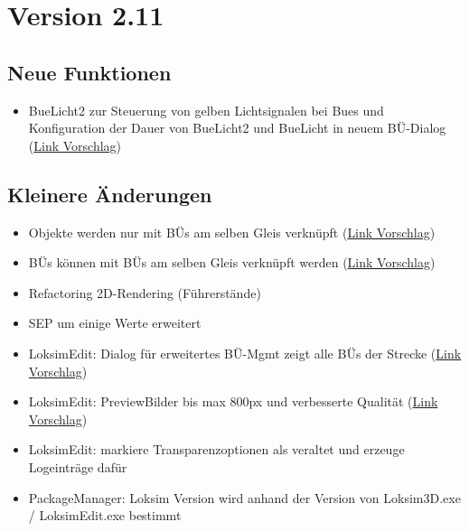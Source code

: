 \section{Version 2.11}

\subsection{Neue Funktionen}
\begin{itemize}
    \item BueLicht2 zur Steuerung von gelben Lichtsignalen bei Bues und Konfiguration der Dauer von BueLicht2 und BueLicht in neuem BÜ-Dialog (\href{https://www.loksimulatoren.de/forum/index.php?thread/8258-ampelsteuerung-an-bahn%C3%BCberg%C3%A4nge-mit-buelicht1-und-buelicht2/}{Link Vorschlag})
\end{itemize}

\subsection{Kleinere Änderungen}
\begin{itemize}
    \item Objekte werden nur mit BÜs am selben Gleis verknüpft (\href{https://www.loksimulatoren.de/forum/index.php?thread/5771-probleme-mit-durch-hauptsignale-%C3%BCberwachten-b%C3%BC/&postID=137100#post137100}{Link Vorschlag})
    \item BÜs können mit BÜs am selben Gleis verknüpft werden (\href{https://www.loksimulatoren.de/forum/index.php?thread/5771-probleme-mit-durch-hauptsignale-%C3%BCberwachten-b%C3%BC/&postID=137100#post137100}{Link Vorschlag})
    \item Refactoring 2D-Rendering (Führerstände)
    \item SEP um einige Werte erweitert
    \item LoksimEdit: Dialog für erweitertes BÜ-Mgmt zeigt alle BÜs der Strecke (\href{https://www.loksimulatoren.de/forum/index.php?thread/5771-probleme-mit-durch-hauptsignale-%C3%BCberwachten-b%C3%BC/&postID=137100#post137100}{Link Vorschlag})
    \item LoksimEdit: PreviewBilder bis max 800px und verbesserte Qualität (\href{https://www.loksimulatoren.de/forum/index.php?thread/8346-qualit%C3%A4t-der-im-editor-erzeugten-vorschaubilder/}{Link Vorschlag})
    \item LoksimEdit: markiere Transparenzoptionen als veraltet und erzeuge Logeinträge dafür
    \item PackageManager: Loksim Version wird anhand der Version von Loksim3D.exe / LoksimEdit.exe bestimmt
\end{itemize}

